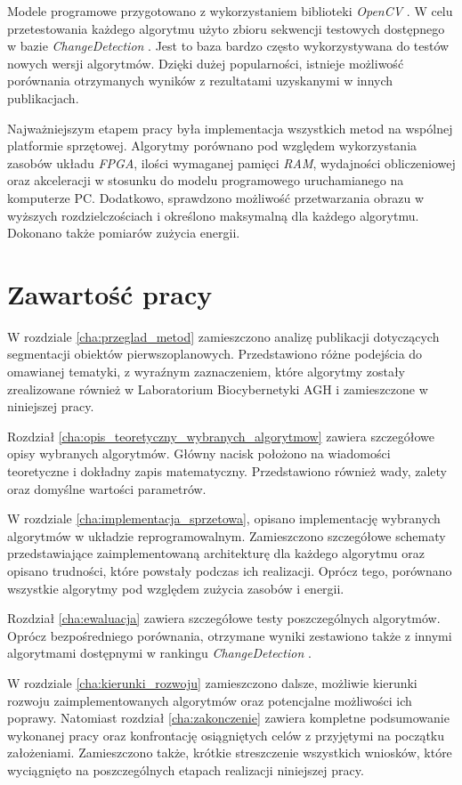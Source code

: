 Modele programowe przygotowano z wykorzystaniem biblioteki \textit{OpenCV} \cite{opencv_17}. W celu przetestowania każdego algorytmu użyto zbioru sekwencji testowych dostępnego w bazie \textit{ChangeDetection} \cite{change_detection_web}. Jest to baza bardzo często wykorzystywana do testów nowych wersji algorytmów. Dzięki dużej popularności, istnieje możliwość porównania otrzymanych wyników z rezultatami uzyskanymi w innych publikacjach. 

Najważniejszym etapem pracy była implementacja wszystkich metod na wspólnej platformie sprzętowej. Algorytmy porównano pod względem wykorzystania zasobów układu \textit{FPGA}, ilości wymaganej pamięci \textit{RAM}, wydajności obliczeniowej oraz akceleracji w stosunku do modelu programowego uruchamianego na komputerze PC. Dodatkowo, sprawdzono możliwość przetwarzania obrazu w wyższych rozdzielczościach i określono maksymalną dla każdego algorytmu. Dokonano także pomiarów zużycia energii. 

\section{Zawartość pracy}
\label{sec:wprowadzenie_zawartosc_pracy}

W rozdziale \ref{cha:przeglad_metod} zamieszczono analizę publikacji dotyczących segmentacji obiektów pierwszoplanowych. Przedstawiono różne podejścia do omawianej tematyki, z wyraźnym zaznaczeniem, które algorytmy zostały zrealizowane również w Laboratorium Biocybernetyki AGH i zamieszczone w niniejszej pracy.

Rozdział \ref{cha:opis_teoretyczny_wybranych_algorytmow} zawiera szczegółowe opisy wybranych algorytmów. Główny nacisk położono na wiadomości teoretyczne i dokładny zapis matematyczny. Przedstawiono również wady, zalety oraz domyślne wartości parametrów.

W rozdziale \ref{cha:implementacja_sprzetowa}, opisano implementację wybranych algorytmów w układzie reprogramowalnym. Zamieszczono szczegółowe schematy przedstawiające zaimplementowaną architekturę dla każdego algorytmu oraz opisano trudności, które powstały podczas ich realizacji. Oprócz tego, porównano wszystkie algorytmy pod względem zużycia zasobów i energii.

Rozdział \ref{cha:ewaluacja} zawiera szczegółowe testy poszczególnych algorytmów. Oprócz bezpośredniego porównania, otrzymane wyniki zestawiono także z innymi algorytmami dostępnymi w rankingu \textit{ChangeDetection} \cite{change_detection_web}.

W rozdziale \ref{cha:kierunki_rozwoju} zamieszczono dalsze, możliwie kierunki rozwoju zaimplementowanych algorytmów oraz potencjalne możliwości ich poprawy. Natomiast rozdział \ref{cha:zakonczenie} zawiera kompletne podsumowanie wykonanej pracy oraz konfrontację osiągniętych celów z przyjętymi na początku założeniami. Zamieszczono także, krótkie streszczenie wszystkich wniosków, które wyciągnięto na poszczególnych etapach realizacji niniejszej pracy.
